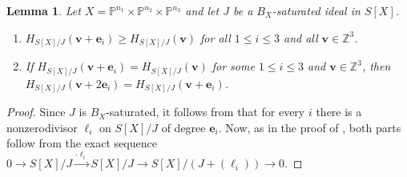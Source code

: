 \documentclass[12pt]{amsart}
\newtheorem{lemma}[theorem]{Lemma}
\theoremstyle{definition}
\theoremstyle{remark}
\theoremstyle{definition}
\newcommand{\vv}{\mathbf{v}}
\newcommand{\ee}{\mathbf{e}}
\newcommand{\HF}[2]{H_{#1}(#2)}
\newcommand{\PP}{\mathbb{P}}
\newcommand{\ZZ}{\mathbb{Z}}
\begin{document}
\begin{lemma}{\label{lem:properties_of_HF}}
    Let $X = \PP^{n_1}\times \PP^{n_2} \times \mathbb{P}^{n_3}$ and let $J$ be a $B_X$-saturated ideal in $S[X]$.
    \begin{enumerate}[label = (\alph*)]
        \item  $\HF{S[X]/J}{\vv + \ee_i} \geq  \HF{S[X]/J}{\vv}$ for all $1\leq i \leq 3$ and all $\vv\in \ZZ^3$. 
        \item If $\HF{S[X]/J}{\vv+ \ee_i} =  \HF{S[X]/J}{\vv}$ for some $1\leq i \leq 3$ and $\vv\in \ZZ^3$, then $\HF{S[X]/J}{\vv + 2\ee_i} =  \HF{S[X]/J}{\vv+\ee_i}$.
    \end{enumerate}
\end{lemma}
\begin{proof}
Since $J$ is $B_X$-saturated, it follows from \cite[Proposition~3.1]{MS04} that for every $i$ there is a nonzerodivisor $\ell_i$ on $S[X]/J$ of degree $\mathbf{e}_i$.
Now, as in the proof of \cite[Proposition~3.5]{Tuy02}, both parts follow from the exact sequence $0 \to S[X]/J \xrightarrow{\cdot \ell_i} S[X]/J \to S[X]/(J+(\ell_i)) \to 0$.
\end{proof}
\end{document}
